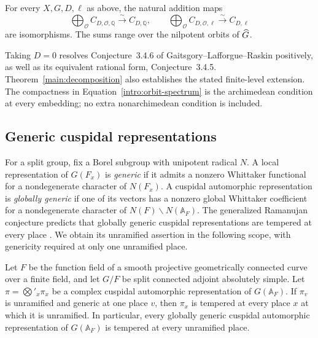 \begin{theorem}\label{main:decomposition}
For every \(X,G,D,\ell\) as above, the natural addition maps
\begin{equation}\label{intro:decomposition}
 \bigoplus_{\mathcal O}C_{D,\mathcal O,\mathbb Q}
       \xrightarrow{\ \sim\ }C_{D,\mathbb Q},
 \qquad
 \bigoplus_{\mathcal O}C_{D,\mathcal O,\ell}
       \xrightarrow{\ \sim\ }C_{D,\ell}
\end{equation}
are isomorphisms. The sums range over the nilpotent orbits of \(\widehat G\).
\end{theorem}

Taking \(D=0\) resolves Conjecture~3.4.6 of
Gaitsgory--Lafforgue--Raskin positively, as well as its equivalent rational
form, Conjecture~3.4.5. Theorem~\ref{main:decomposition} also establishes
the stated finite-level extension. The compactness in
Equation~\eqref{intro:orbit-spectrum} is the archimedean condition at
every embedding; no extra nonarchimedean condition is included.

\subsection{Generic cuspidal representations}

For a split group, fix a Borel subgroup with unipotent radical \(N\).
A local representation of \(G(F_x)\) is \emph{generic} if it admits a
nonzero Whittaker functional for a nondegenerate character of \(N(F_x)\).
A cuspidal automorphic representation is \emph{globally generic} if one
of its vectors has a nonzero global Whittaker coefficient for a
nondegenerate character of \(N(F)\backslash N(\mathbb A_F)\).
The generalized Ramanujan conjecture predicts that globally generic
cuspidal representations are tempered at every place
\cite[Section~1.1]{CiubotaruHarris}. We obtain its unramified assertion
in the following scope, with genericity required at only one unramified
place.

\begin{corollary}
\label{main:generic-ramanujan}
Let \(F\) be the function field of a smooth projective geometrically
connected curve over a finite field, and let \(G/F\) be split connected
adjoint absolutely simple. Let
\(\pi=\bigotimes'_x\pi_x\) be a complex cuspidal automorphic
representation of \(G(\mathbb A_F)\). If \(\pi_v\) is unramified and
generic at one place \(v\), then \(\pi_x\) is tempered at every place
\(x\) at which it is unramified. In particular, every globally generic
cuspidal automorphic representation of \(G(\mathbb A_F)\) is tempered
at every unramified place.
\end{corollary}

